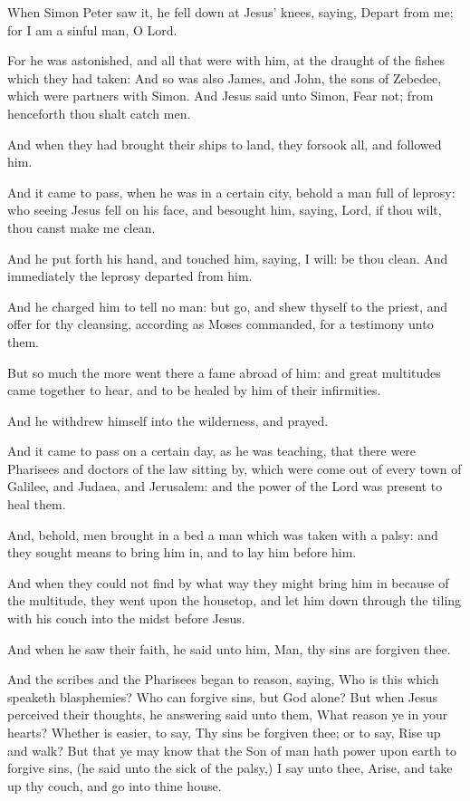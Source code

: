 \verse When Simon Peter saw it, he fell down at Jesus' knees, saying, Depart from me; for I am a sinful man, O Lord.

\verse For he was astonished, and all that were with him, at the draught of the fishes which they had taken: \verse And so was also James, and John, the sons of Zebedee, which were partners with Simon. And Jesus said unto Simon, Fear not; from henceforth thou shalt catch men.

\verse And when they had brought their ships to land, they forsook all, and followed him.

\verse And it came to pass, when he was in a certain city, behold a man full of leprosy: who seeing Jesus fell on his face, and besought him, saying, Lord, if thou wilt, thou canst make me clean.

\verse And he put forth his hand, and touched him, saying, I will: be thou clean. And immediately the leprosy departed from him.

\verse And he charged him to tell no man: but go, and shew thyself to the priest, and offer for thy cleansing, according as Moses commanded, for a testimony unto them.

\verse But so much the more went there a fame abroad of him: and great multitudes came together to hear, and to be healed by him of their infirmities.

\verse And he withdrew himself into the wilderness, and prayed.

\verse And it came to pass on a certain day, as he was teaching, that there were Pharisees and doctors of the law sitting by, which were come out of every town of Galilee, and Judaea, and Jerusalem: and the power of the Lord was present to heal them.

\verse And, behold, men brought in a bed a man which was taken with a palsy: and they sought means to bring him in, and to lay him before him.

\verse And when they could not find by what way they might bring him in because of the multitude, they went upon the housetop, and let him down through the tiling with his couch into the midst before Jesus.

\verse And when he saw their faith, he said unto him, Man, thy sins are forgiven thee.

\verse And the scribes and the Pharisees began to reason, saying, Who is this which speaketh blasphemies? Who can forgive sins, but God alone?  \verse But when Jesus perceived their thoughts, he answering said unto them, What reason ye in your hearts?  \verse Whether is easier, to say, Thy sins be forgiven thee; or to say, Rise up and walk?  \verse But that ye may know that the Son of man hath power upon earth to forgive sins, (he said unto the sick of the palsy,) I say unto thee, Arise, and take up thy couch, and go into thine house.

